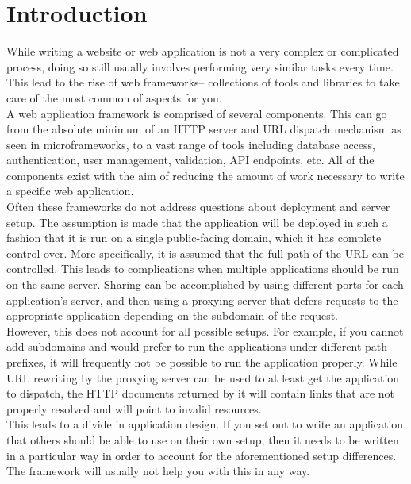\documentclass{sig-alternate-05-2015}
\begin{document}
\printccsdesc


\newpage
\section{Introduction}
While writing a website or web application is not a very complex or complicated process, doing so still usually involves performing very similar tasks every time. This lead to the rise of web frameworks-- collections of tools and libraries to take care of the most common of aspects for you. \\

A web application framework is comprised of several components. This can go from the absolute minimum of an HTTP server and URL dispatch mechanism as seen in microframeworks, to a vast range of tools including database access, authentication, user management, validation, API endpoints, etc. All of the components exist with the aim of reducing the amount of work necessary to write a specific web application. \\

Often these frameworks do not address questions about deployment and server setup. The assumption is made that the application will be deployed in such a fashion that it is run on a single public-facing domain, which it has complete control over. More specifically, it is assumed that the full path of the URL can be controlled. This leads to complications when multiple applications should be run on the same server. Sharing can be accomplished by using different ports for each application's server, and then using a proxying server that defers requests to the appropriate application depending on the subdomain of the request. \\

However, this does not account for all possible setups. For example, if you cannot add subdomains and would prefer to run the applications under different path prefixes, it will frequently not be possible to run the application properly. While URL rewriting by the proxying server can be used to at least get the application to dispatch, the HTTP documents returned by it will contain links that are not properly resolved and will point to invalid resources. \\

This leads to a divide in application design. If you set out to write an application that others should be able to use on their own setup, then it needs to be written in a particular way in order to account for the aforementioned setup differences. The framework will usually not help you with this in any way. \\
\end{document}
